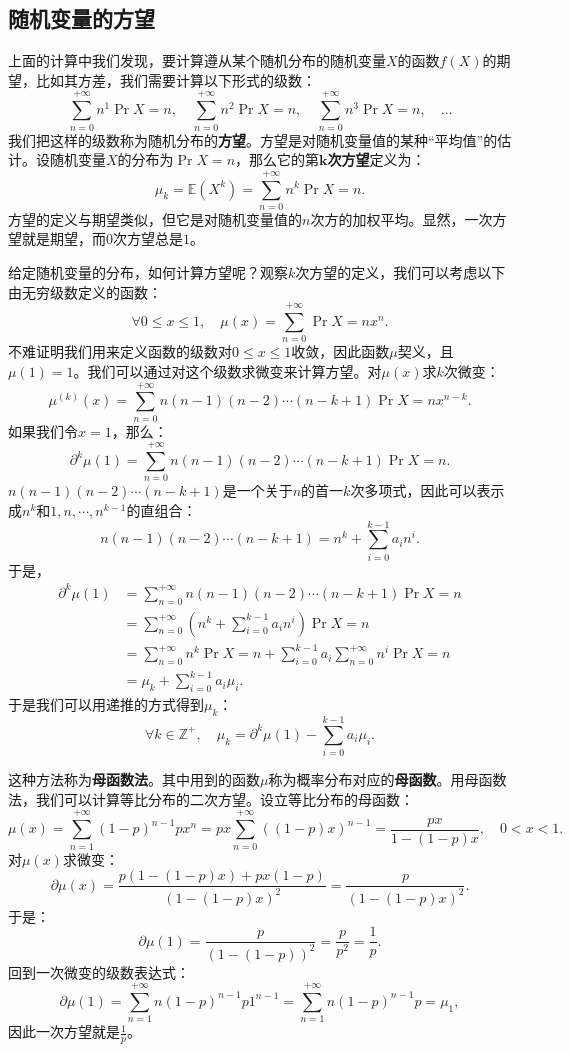 \documentclass[12pt,UTF8,fontset=none]{ctexbook}
\begin{document}
\subsection{随机变量的方望}
上面的计算中我们发现，要计算遵从某个随机分布的随机变量$X$的函数$f(X)$的期望，比如其方差，我们需要计算以下形式的级数：
\[
    \sum_{n=0}^{+\infty} n^1 \Pr{X=n}, \quad \sum_{n=0}^{+\infty} n^2 \Pr{X=n}, \quad \sum_{n=0}^{+\infty} n^3 \Pr{X=n}, \quad \ldots
\]
我们把这样的级数称为随机分布的\textbf{方望}。方望是对随机变量值的某种“平均值”的估计。设随机变量$X$的分布为$\Pr{X=n}$，那么它的第$\boldsymbol{k}$\textbf{次方望}定义为：
\[
    \mu_k = \mathbb{E}(X^k) = \sum_{n=0}^{+\infty} n^k \Pr{X=n}.
\]
方望的定义与期望类似，但它是对随机变量值的$n$次方的加权平均。显然，一次方望就是期望，而$0$次方望总是$1$。

给定随机变量的分布，如何计算方望呢？观察$k$次方望的定义，我们可以考虑以下由无穷级数定义的函数：
\[
    \forall 0\leqslant x \leqslant 1, \quad \mu(x) = \sum_{n=0}^{+\infty} \Pr{X=n} x^n.
\]
不难证明我们用来定义函数的级数对$0\leqslant x \leqslant 1$收敛，因此函数$\mu$契义，且$\mu(1) = 1$。我们可以通过对这个级数求微变来计算方望。对$\mu(x)$求$k$次微变：
\[
    \mu^{(k)}(x) = \sum_{n=0}^{+\infty} n(n-1)(n-2)\cdots(n-k+1) \Pr{X=n} x^{n-k}.
\]
如果我们令$x=1$，那么： 
\[
    \partial^k \mu(1) = \sum_{n=0}^{+\infty} n(n-1)(n-2)\cdots(n-k+1) \Pr{X=n}.
\]
$n(n-1)(n-2)\cdots(n-k+1)$是一个关于$n$的首一$k$次多项式，因此可以表示成$n^k$和$1,n,\cdots,n^{k-1}$的直组合：
\[
    n(n-1)(n-2)\cdots(n-k+1) = n^k + \sum_{i=0}^{k-1} a_i n^i.
\]
于是，
\begin{align*}
    \partial^k \mu(1) &= \sum_{n=0}^{+\infty} n(n-1)(n-2)\cdots(n-k+1) \Pr{X=n} \\
    &= \sum_{n=0}^{+\infty} \left(n^k + \sum_{i=0}^{k-1} a_i n^i \right) \Pr{X=n} \\
    &= \sum_{n=0}^{+\infty} n^k \Pr{X=n} + \sum_{i=0}^{k-1} a_i \sum_{n=0}^{+\infty} n^i \Pr{X=n} \\
    &= \mu_k + \sum_{i=0}^{k-1} a_i \mu_i.
\end{align*}
于是我们可以用递推的方式得到$\mu_k$：
\[
    \forall k \in \mathbb{Z}^+, \quad \mu_k = \partial^k \mu(1) - \sum_{i=0}^{k-1} a_i \mu_i.
\]

这种方法称为\textbf{母函数法}。其中用到的函数$\mu$称为概率分布对应的\textbf{母函数}。用母函数法，我们可以计算等比分布的二次方望。设立等比分布的母函数：
\[
    \mu(x) = \sum_{n=1}^{+\infty} (1 - p)^{n-1} p x^n = px\sum_{n=0}^{+\infty} ((1 - p)x)^{n-1} = \frac{px}{1 - (1 - p)x}, \quad 0 < x < 1.
\]
对$\mu(x)$求微变：
\[
    \partial \mu(x) = \frac{p(1 - (1 - p)x) + px(1 - p)}{(1 - (1 - p)x)^2} = \frac{p}{(1 - (1 - p)x)^2}.
\]
于是：
$$ \partial \mu(1) = \frac{p}{(1 - (1 - p))^2} = \frac{p}{p^2} = \frac{1}{p}.$$
回到一次微变的级数表达式：
$$ \partial \mu(1) = \sum_{n=1}^{+\infty} n (1 - p)^{n-1} p 1^{n-1} = \sum_{n=1}^{+\infty} n (1 - p)^{n-1} p = \mu_1, $$
因此一次方望就是$\displaystyle \frac{1}{p}$。
\end{document}
